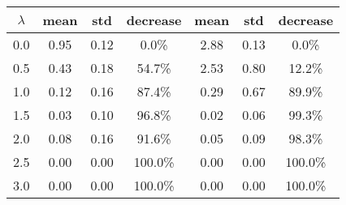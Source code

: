 \begin{tabular}{c||c|c|c||c|c|c}
\toprule
 $\lambda$ &  mean &  std & decrease &  mean &  std & decrease \\
\midrule
       0.0 &  0.95 & 0.12 &    0.0\% &  2.88 & 0.13 &    0.0\% \\
       0.5 &  0.43 & 0.18 &   54.7\% &  2.53 & 0.80 &   12.2\% \\
       1.0 &  0.12 & 0.16 &   87.4\% &  0.29 & 0.67 &   89.9\% \\
       1.5 &  0.03 & 0.10 &   96.8\% &  0.02 & 0.06 &   99.3\% \\
       2.0 &  0.08 & 0.16 &   91.6\% &  0.05 & 0.09 &   98.3\% \\
       2.5 &  0.00 & 0.00 &  100.0\% &  0.00 & 0.00 &  100.0\% \\
       3.0 &  0.00 & 0.00 &  100.0\% &  0.00 & 0.00 &  100.0\% \\
\bottomrule
\end{tabular}
